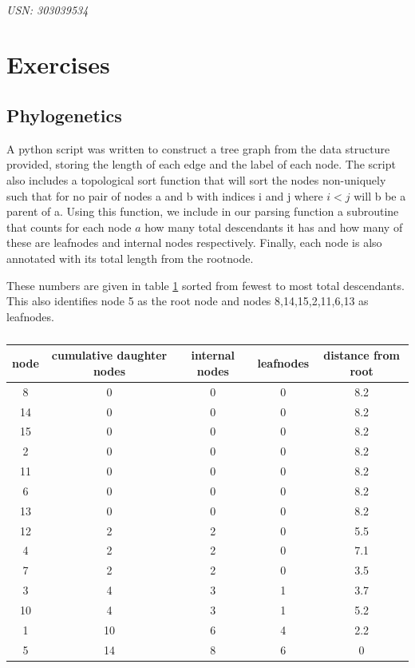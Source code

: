 \documentclass{article}
\begin{document}
\begin{center}
\textbf{\LARGE{}}\\
\textit{USN: 303039534}\\
\end{center}


\section{Exercises}




\subsection{Phylogenetics}

A python script was written to construct a tree graph from the data structure provided, storing the length of each edge and the label of each node. The script also includes a topological sort function that will sort the nodes non-uniquely such that for no pair of nodes a and b with indices i and j where $i < j$ will b be a parent of a. Using this function, we include in our parsing function a subroutine that counts for each node $a$ how many total descendants it has and how many of these are leafnodes and internal nodes respectively. Finally, each node is also annotated with its total length from the rootnode.

These numbers are given in table \ref{tab:treesum} sorted from fewest to most total descendants. This also identifies node 5 as the root node and nodes 8,14,15,2,11,6,13 as leafnodes.

\begin{table}[h]
\centering
\begin{tabular}{ |c|c|c|c|c|}
\hline
 node & cumulative daughter nodes & internal nodes & leafnodes & distance from root \\
\hline
8 & 0 & 0 & 0 & 8.2 \\
14 & 0 & 0 & 0 & 8.2 \\
15 & 0 & 0 & 0 & 8.2 \\
2 & 0 & 0 & 0 & 8.2 \\
11 & 0 & 0 & 0 & 8.2 \\
6 & 0 & 0 & 0 & 8.2 \\
13 & 0 & 0 & 0 & 8.2 \\
\hline
12 & 2 & 2 & 0 & 5.5 \\
4 & 2 & 2 & 0 & 7.1 \\
7 & 2 & 2 & 0 & 3.5 \\
3 & 4 & 3 & 1 & 3.7 \\
10 & 4 & 3 & 1 & 5.2 \\
1 & 10 & 6 & 4 & 2.2 \\
5 & 14 & 8 & 6 & 0 \\
\hline
\end{tabular}
\caption{}
\label{tab:treesum}
\end{table}
\end{document}
